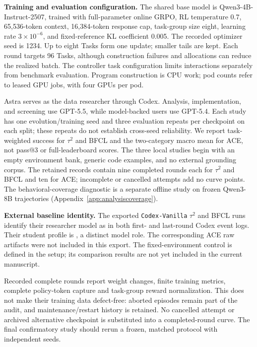 \textbf{Training and evaluation configuration.}\quad
The shared base model is Qwen3-4B-Instruct-2507, trained with full-parameter online GRPO, RL temperature 0.7, 65,536-token context, 16,384-token response cap, task-group size eight, learning rate $3\times10^{-6}$, and fixed-reference KL coefficient 0.005. The recorded optimizer seed is 1234. Up to eight Tasks form one update; smaller tails are kept. Each round targets 96 Tasks, although construction failures and allocations can reduce the realized batch. The controller task configuration limits interactions separately from benchmark evaluation. Program construction is CPU work; pod counts refer to leased GPU jobs, with four GPUs per pod.

Astra serves as the data researcher through Codex. Analysis, implementation,
and screening use GPT-5.5, while model-backed users use GPT-5.4. Each study has
one evolution/training seed and three evaluation repeats per checkpoint on
each split; these repeats do not establish cross-seed reliability. We report
task-weighted success for $\tau^2$ and BFCL and the two-category macro mean for
ACE, not pass@3 or full-leaderboard scores. The three local studies begin with
an empty environment bank, generic code examples, and no external grounding
corpus. The retained records contain nine completed rounds each for $\tau^2$
and BFCL and ten for ACE; incomplete or cancelled attempts add no curve points.
The behavioral-coverage diagnostic is a separate offline study on frozen
Qwen3-8B trajectories (Appendix~\ref{app:analysiscoverage}).

\textbf{External baseline identity.}\quad
The exported \texttt{Codex-Vanilla} $\tau^2$ and BFCL runs identify their researcher
model as  in both first- and last-round Codex event logs.
Their student profile is , a distinct model role.
The corresponding ACE raw artifacts were not included in this export.
The fixed-environment control is defined in the setup; its comparison results
are not yet included in the current manuscript.

Recorded complete rounds report weight changes, finite training metrics, complete policy-token capture and task-group reward normalization. This does not make their training data defect-free: aborted episodes remain part of the audit, and maintenance/restart history is retained. No cancelled attempt or archived alternative checkpoint is substituted into a completed-round curve. The final confirmatory study should rerun a frozen, matched protocol with independent seeds.

